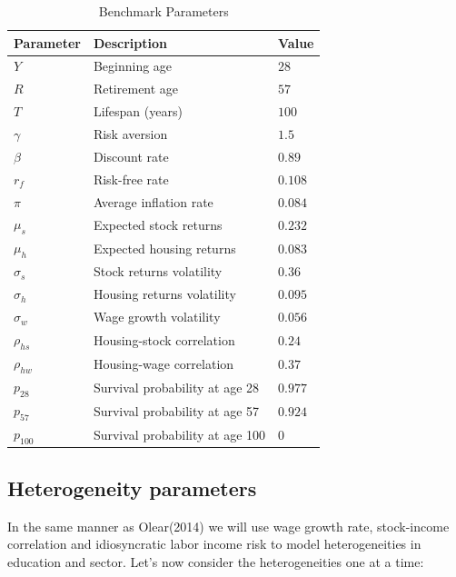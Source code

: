 \begin{table}
	\centering
	\caption{Benchmark Parameters}
	\begin{tabular}[c]{lll}
		\hline
		Parameter&Description&Value\\
		\hline
		$Y$&Beginning age&$28$\\
		$R$&Retirement age&$57$\\
		$T$&Lifespan (years)&$100$\\
		$\gamma$&Risk aversion&$1.5$\\
		$\beta$&Discount rate&$0.89$\\
		$r_f$&Risk-free rate&$0.108$\\
		$\pi$&Average inflation rate&$0.084$\\
		\hline
		$\mu_s$&Expected stock returns&$0.232$\\
		$\mu_h$&Expected housing returns&$0.083$\\
		$\sigma_s$&Stock returns volatility&$0.36$\\
		$\sigma_h$&Housing returns volatility&$0.095$\\
		$\sigma_w$&Wage growth volatility&$0.056$\\
		$\rho_{hs}$&Housing-stock correlation&$0.24$\\
		$\rho_{hw}$&Housing-wage correlation&$0.37$\\
		\hline
		$p_{28}$&Survival probability at age 28&$0.977$\\
		$p_{57}$&Survival probability at age 57&$0.924$\\
		$p_{100}$&Survival probability at age 100&$0$\\	
		\hline
	\end{tabular}
\end{table}


\subsection{Heterogeneity parameters}
In the same manner as Olear(2014) we will use wage growth rate, stock-income correlation and idiosyncratic labor income risk to model heterogeneities in education and sector. Let's now consider the heterogeneities one at a time:

